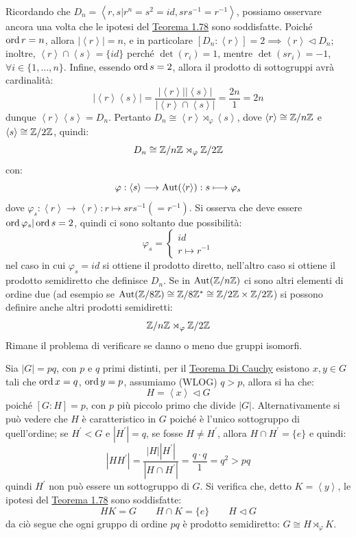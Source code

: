 \documentclass[11pt]{scrartcl}
\begin{document}
\begin{example}
    Ricordando che $D_n = \left<r,s | r^n = s^2 = id, srs^{-1} = r^{-1}\right>$, possiamo osservare ancora una volta che le ipotesi del \hyperref[t:1.78]{Teorema 1.78} sono soddisfatte. Poiché $\operatorname{ord} r = n$, allora $|\left<r\right>| = n$, 
    e in particolare $[D_n : \left<r\right>] = 2 \implies \left<r\right> \triangleleft D_n$; inoltre, $\left<r\right> \cap \left<s\right> = \{id\}$ perché $\det(r_i) = 1$, mentre $\det(sr_i) = -1$, $\forall i \in \{1,\ldots,n\}$. Infine, essendo $\operatorname{ord} s = 2$, allora il prodotto di sottogruppi avrà cardinalità:
        \[ |\left<r\right>\left<s\right>| = \frac{|\left<r\right>||\left<s\right>|}{|\left<r\right> \cap \left<s\right>|} = \frac{2n}{1} = 2n
            \]
    dunque $\left<r\right>\left<s\right> = D_n$. Pertanto $D_n \cong \left<r\right> \rtimes_{\varphi} \left<s\right>$, dove $\left<r\right> \cong {\mathbb Z}/n{\mathbb Z}$ e $\left<s\right> \cong \mathbb{Z}/{2}\mathbb{Z}$, quindi:
        \[ D_n \cong {\mathbb Z}/n{\mathbb Z} \rtimes_{\varphi} \mathbb{Z}/{2}\mathbb{Z}
            \]
    con:
        \[ \varphi : \left<s\right> \longrightarrow \operatorname{Aut}(\left<r\right>) : s \longmapsto \varphi_s
            \]
    dove $\varphi_s : \left<r\right> \longrightarrow \left<r\right> : r \longmapsto srs^{-1} (= r^{-1})$. Si osserva che deve essere $\operatorname{ord} \varphi_s | \operatorname{ord} s = 2$, quindi ci sono soltanto due possibilità:
        \[ \varphi_s = \begin{cases}
            id \\
            r \longmapsto r^{-1}
            \end{cases}
        \]
    nel caso in cui $\varphi_s = id$ si ottiene il prodotto diretto, nell'altro caso si ottiene il prodotto semidiretto che definisce $D_n$. Se in $\operatorname{Aut}({\mathbb Z}/n{\mathbb Z})$ ci sono altri elementi di ordine due
     (ad esempio se $\operatorname{Aut}(\mathbb{Z}/{8}\mathbb{Z}) \cong \mathbb{Z}/{8}\mathbb{Z}^* \cong \mathbb{Z}/{2}\mathbb{Z} \times \mathbb{Z}/{2}\mathbb{Z}$) si possono definire anche altri prodotti semidiretti:
    \[ {\mathbb Z}/n{\mathbb Z} \rtimes_{\varphi} \mathbb{Z}/{2}\mathbb{Z}
        \]
    Rimane il problema di verificare se danno o meno due gruppi isomorfi.
\end{example}

\begin{example}
    Sia $|G| = pq$, con $p$ e $q$ primi distinti, per il \hyperref[p:Cauchy]{Teorema Di Cauchy} esistono $x,y \in G$ tali che $\operatorname{ord} x = q$, $\operatorname{ord} y = p$, assumiamo (WLOG) $q>p$, allora si ha che:
        \[ H = \left<x\right> \triangleleft G
            \]
    poiché $[G : H] = p$, con $p$ più piccolo primo che divide $|G|$. Alternativamente si può vedere che $H$ è caratteristico in $G$ poiché è l'unico sottogruppo di quell'ordine;
    se $H^{\prime} < G$ e $|H^{\prime}| = q$, se fosse $H \ne H^{\prime}$, allora $H \cap H^{\prime} = \{e\}$ e quindi:
    \[ |HH^{\prime}| = \frac{|H||H^{\prime}|}{|H \cap H^{\prime}|} = \frac{q \cdot q}{1} = q^2 > pq
        \]
    quindi $H^{\prime}$ non può essere un sottogruppo di $G$. Si verifica che, detto $K = \left<y\right>$, le ipotesi del \hyperref[t:1.78]{Teorema 1.78} sono soddisfatte:
        \[ HK = G \qquad H \cap K = \{e\} \qquad H \triangleleft G
            \]
da ciò segue che ogni gruppo di ordine $pq$ è prodotto semidiretto: $G \cong H \rtimes_{\varphi} K$.
\end{example}
\end{document}
